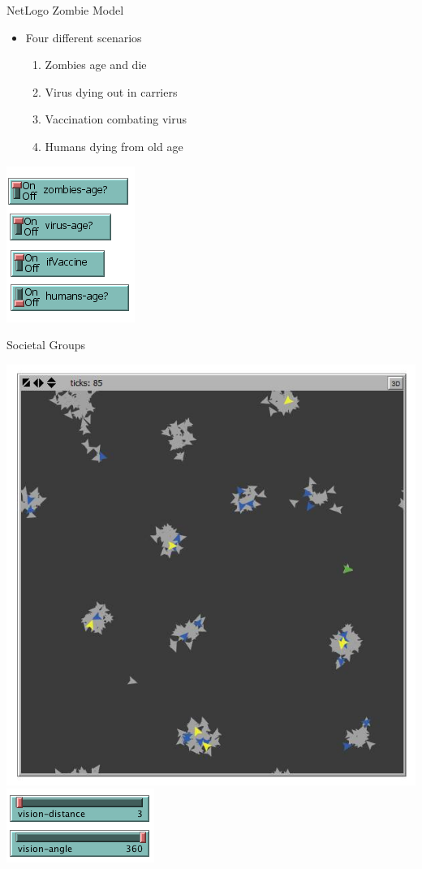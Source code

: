 \documentclass{beamer}
\begin{document}
\begin{frame}{NetLogo Zombie Model}
\begin{itemize}
\item Four different scenarios
\pause
\begin{enumerate}
\item Zombies age and die
\pause
\item Virus dying out in carriers
\pause
\item Vaccination combating virus
\pause
\item Humans dying from old age
\end{enumerate}
\end{itemize}
\begin{center}
\pause
\includegraphics[scale=0.5]{classes}
\end{center}
\end{frame}

\begin{frame}{Societal Groups}
\begin{center}
\includegraphics[scale=0.25]{groups}
\includegraphics[scale=0.6]{grouping}
\end{center}
\end{frame}
\end{document}
